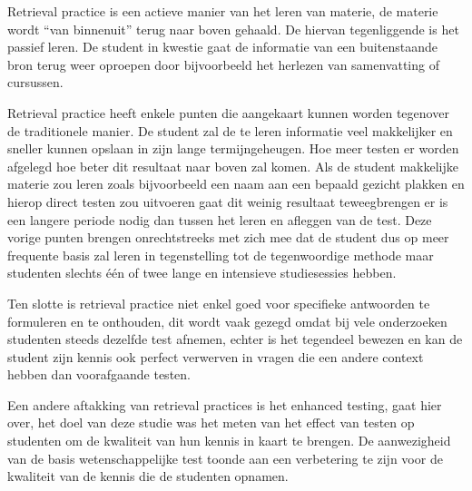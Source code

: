 \documentclass{hogent-article}
\begin{document}
Retrieval practice is een actieve manier van het leren van materie, de materie wordt “van binnenuit” terug naar boven gehaald. De hiervan tegenliggende is het passief leren. De student in kwestie gaat de informatie van een buitenstaande bron terug weer oproepen door bijvoorbeeld het herlezen van samenvatting of cursussen. \par
Retrieval practice heeft enkele punten die aangekaart kunnen worden tegenover de traditionele manier. De student zal de te leren informatie veel makkelijker en sneller kunnen opslaan in zijn lange termijngeheugen. Hoe meer testen er worden afgelegd hoe beter dit resultaat naar boven zal komen. Als de student makkelijke materie zou leren zoals bijvoorbeeld een naam aan een bepaald gezicht plakken en hierop direct testen zou uitvoeren gaat dit weinig resultaat teweegbrengen er is een langere periode nodig dan tussen het leren en afleggen van de test. Deze vorige punten brengen onrechtstreeks met zich mee dat de student dus op meer frequente basis zal leren in tegenstelling tot de tegenwoordige methode maar studenten slechts één of twee lange en intensieve studiesessies hebben. \par

Ten slotte is retrieval practice niet enkel goed voor specifieke antwoorden te formuleren en te onthouden, dit wordt vaak gezegd omdat bij vele onderzoeken studenten steeds dezelfde test afnemen, echter is het tegendeel bewezen en kan de student zijn kennis ook perfect verwerven in vragen die een andere context hebben dan voorafgaande testen. \par

Een andere aftakking van retrieval practices is het enhanced testing, \cite{Baghdady2014} gaat hier over, het doel van deze studie was het meten van het effect van testen op studenten om de kwaliteit van hun kennis in kaart te brengen. De aanwezigheid van de basis wetenschappelijke test toonde aan een verbetering te zijn voor de kwaliteit van de kennis die de studenten opnamen. 
\smallskip
\end{document}
